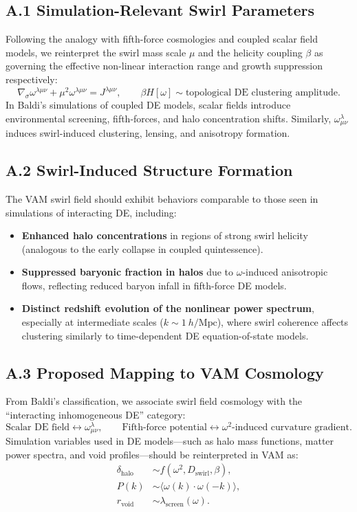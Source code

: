 \documentclass[12pt]{article}
\begin{document}
    \subsection*{A.1 Simulation-Relevant Swirl Parameters}
    Following the analogy with fifth-force cosmologies and coupled scalar field models, we reinterpret the swirl mass scale $\mu$ and the helicity coupling $\beta$ as governing the effective non-linear interaction range and growth suppression respectively:
    \[
        \nabla_\sigma \omega^{\lambda\mu\nu} + \mu^2 \omega^{\lambda\mu\nu} = J^{\lambda\mu\nu}, \qquad
        \beta H[\omega] \sim \text{topological DE clustering amplitude}.
    \]
    In Baldi’s simulations of coupled DE models, scalar fields introduce environmental screening, fifth-forces, and halo concentration shifts. Similarly, $\omega^{\lambda}_{\mu\nu}$ induces swirl-induced clustering, lensing, and anisotropy formation.

    \subsection*{A.2 Swirl-Induced Structure Formation}
    The VAM swirl field should exhibit behaviors comparable to those seen in simulations of interacting DE, including:
    \begin{itemize}
        \item \textbf{Enhanced halo concentrations} in regions of strong swirl helicity (analogous to the early collapse in coupled quintessence).
        \item \textbf{Suppressed baryonic fraction in halos} due to $\omega$-induced anisotropic flows, reflecting reduced baryon infall in fifth-force DE models.
        \item \textbf{Distinct redshift evolution of the nonlinear power spectrum}, especially at intermediate scales ($k \sim 1~h/\mathrm{Mpc}$), where swirl coherence affects clustering similarly to time-dependent DE equation-of-state models.
    \end{itemize}

    \subsection*{A.3 Proposed Mapping to VAM Cosmology}
    From Baldi's classification, we associate swirl field cosmology with the ``interacting inhomogeneous DE'' category:
    \[
        \text{Scalar DE field} \leftrightarrow \omega^\lambda_{\mu\nu}, \qquad \text{Fifth-force potential} \leftrightarrow \omega^2\text{-induced curvature gradient}.
    \]
    Simulation variables used in DE models—such as halo mass functions, matter power spectra, and void profiles—should be reinterpreted in VAM as:
    \begin{align*}
        \delta_{\text{halo}} &\sim f(\omega^2, D_\text{swirl}, \beta), \\
        P(k) &\sim \langle \omega(k) \cdot \omega(-k) \rangle, \\
        r_{\text{void}} &\sim \lambda_{\text{screen}}(\omega).
    \end{align*}
\end{document}
